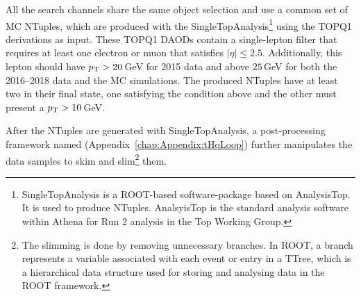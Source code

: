 All the search channels share the same object selection and use a common set of MC NTuples, which 
are produced with the SingleTopAnalysis\footnote{SingleTopAnalysis is
a ROOT-based software-package based on AnalysisTop. It is used to produce
NTuples. AnalsyisTop is the standard analysis software within Athena for Run 2 analysis 
in the Top Working Group.} using the TOPQ1 derivations %
as input. These TOPQ1 DAODs contain a single-lepton filter 
that requires at least one electron or muon that satisfies $|\eta| \leq 2.5$. %
Additionally, this lepton should have $p_{\text{T}} >20\,$GeV for 2015 data and above $25\,$GeV 
for both the 2016--2018 data and the MC simulations.
The produced NTuples have at least two \emu in their final state, one satisfying the condition above and
the other must present a  $p_{\text{T}} >10\,$GeV. %

After the NTuples are generated with SingleTopAnalysis, a post-processing framework named \thqloop 
(Appendix~\ref{chap:Appendix:tHqLoop})
further manipulates the data samples to skim and slim\footnote{The slimming is done by removing 
unnecessary branches. In ROOT, a branch represents a variable associated with each event or entry in a TTree, which is a hierarchical data structure used for storing and analysing data in the ROOT framework.} them. 


